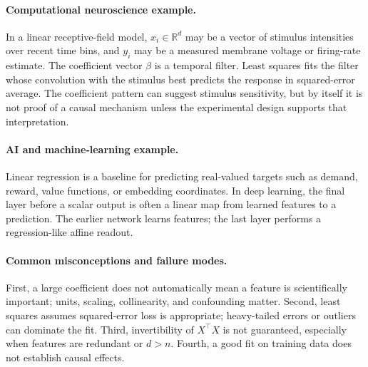 \paragraph{Computational neuroscience example.}
In a linear receptive-field model, \(x_i\in\mathbb R^d\) may be a vector of stimulus intensities over recent time bins, and \(y_i\) may be a measured membrane voltage or firing-rate estimate. The coefficient vector \(\beta\) is a temporal filter. Least squares fits the filter whose convolution with the stimulus best predicts the response in squared-error average. The coefficient pattern can suggest stimulus sensitivity, but by itself it is not proof of a causal mechanism unless the experimental design supports that interpretation.

\paragraph{AI and machine-learning example.}
Linear regression is a baseline for predicting real-valued targets such as demand, reward, value functions, or embedding coordinates. In deep learning, the final layer before a scalar output is often a linear map from learned features to a prediction. The earlier network learns features; the last layer performs a regression-like affine readout.

\paragraph{Common misconceptions and failure modes.}
First, a large coefficient does not automatically mean a feature is scientifically important; units, scaling, collinearity, and confounding matter. Second, least squares assumes squared-error loss is appropriate; heavy-tailed errors or outliers can dominate the fit. Third, invertibility of \(X^\top X\) is not guaranteed, especially when features are redundant or \(d>n\). Fourth, a good fit on training data does not establish causal effects.

